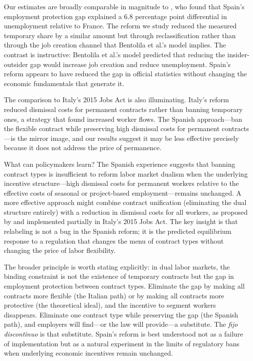 \documentclass[12pt]{article}
\begin{document}
Our estimates are broadly comparable in magnitude to \citet{bentolila2012two}, who found that Spain's employment protection gap explained a 6.8 percentage point differential in unemployment relative to France. The reform we study reduced the measured temporary share by a similar amount but through reclassification rather than through the job creation channel that Bentolila et al.'s model implies. The contrast is instructive: Bentolila et al.'s model predicted that reducing the insider-outsider gap would increase job creation and reduce unemployment. Spain's reform appears to have reduced the gap in official statistics without changing the economic fundamentals that generate it.

The comparison to Italy's 2015 Jobs Act is also illuminating. Italy's reform reduced dismissal costs for permanent contracts rather than banning temporary ones, a strategy that \citet{kugler2007employment} found increased worker flows. The Spanish approach---ban the flexible contract while preserving high dismissal costs for permanent contracts---is the mirror image, and our results suggest it may be less effective precisely because it does not address the price of permanence.

What can policymakers learn? The Spanish experience suggests that banning contract types is insufficient to reform labor market dualism when the underlying incentive structure---high dismissal costs for permanent workers relative to the effective costs of seasonal or project-based employment---remains unchanged. A more effective approach might combine contract unification (eliminating the dual structure entirely) with a reduction in dismissal costs for all workers, as proposed by \citet{blanchard2003european} and implemented partially in Italy's 2015 Jobs Act. The key insight is that relabeling is not a bug in the Spanish reform; it is the predicted equilibrium response to a regulation that changes the menu of contract types without changing the price of labor flexibility.

The broader principle is worth stating explicitly: in dual labor markets, the binding constraint is not the existence of temporary contracts but the gap in employment protection between contract types. Eliminate the gap by making all contracts more flexible (the Italian path) or by making all contracts more protective (the theoretical ideal), and the incentive to segment workers disappears. Eliminate one contract type while preserving the gap (the Spanish path), and employers will find---or the law will provide---a substitute. The \emph{fijo discontinuo} is that substitute. Spain's reform is best understood not as a failure of implementation but as a natural experiment in the limits of regulatory bans when underlying economic incentives remain unchanged.
\end{document}
